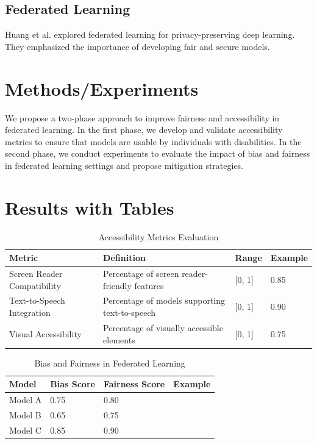 \documentclass{article}
\begin{document}
\subsection{Federated Learning}
Huang et al. \cite{huang2021federated} explored federated learning for privacy-preserving deep learning. They emphasized the importance of developing fair and secure models.

\section{Methods/Experiments}
We propose a two-phase approach to improve fairness and accessibility in federated learning. In the first phase, we develop and validate accessibility metrics to ensure that models are usable by individuals with disabilities. In the second phase, we conduct experiments to evaluate the impact of bias and fairness in federated learning settings and propose mitigation strategies.

\section{Results with Tables}
\begin{table}[ht]
\centering
\caption{Accessibility Metrics Evaluation}
\begin{tabular}{@{}llll@{}}
\toprule
Metric & Definition & Range & Example \\
\midrule
Screen Reader Compatibility & Percentage of screen reader-friendly features & [0, 1] & 0.85 \\
Text-to-Speech Integration & Percentage of models supporting text-to-speech & [0, 1] & 0.90 \\
Visual Accessibility & Percentage of visually accessible elements & [0, 1] & 0.75 \\
\bottomrule
\end{tabular}
\end{table}

\begin{table}[ht]
\centering
\caption{Bias and Fairness in Federated Learning}
\begin{tabular}{@{}llll@{}}
\toprule
Model & Bias Score & Fairness Score & Example \\
\midrule
Model A & 0.75 & 0.80 & \\
Model B & 0.65 & 0.75 & \\
Model C & 0.85 & 0.90 & \\
\bottomrule
\end{tabular}
\end{table}
\end{document}

